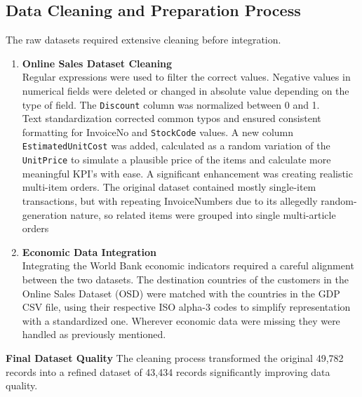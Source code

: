 \documentclass[a4paper,11pt]{article}
\begin{document}
\subsection{Data Cleaning and Preparation Process}

The raw datasets required extensive cleaning before integration.

\begin{enumerate}
    \item  \textbf{Online Sales Dataset Cleaning}\\
    Regular expressions were used to filter the correct values.
    Negative values in numerical fields were deleted or changed in absolute value depending on the type of field.
    The \texttt{Discount} column was normalized between 0 and 1.\\
    Text standardization corrected common typos and ensured consistent formatting for InvoiceNo and \texttt{StockCode} values.
    A new column \texttt{EstimatedUnitCost} was added, calculated as a random variation of the \texttt{UnitPrice} to simulate a plausible price of the items and calculate more meaningful KPI's with ease.
    A significant enhancement was creating realistic multi-item orders.
    The original dataset contained mostly single-item transactions, but with repeating InvoiceNumbers due to its allegedly random-generation nature, so related items were grouped into single multi-article orders

    \item \textbf{Economic Data Integration}\\
    Integrating the World Bank economic indicators required a careful alignment between the two datasets. 
    The destination countries of the customers in the Online Sales Dataset (OSD) were matched with the countries in the GDP CSV file, using their respective ISO alpha-3 codes to simplify representation with a standardized one.
    Wherever economic data were missing they were handled as previously mentioned.
\end{enumerate}
\textbf{Final Dataset Quality}
The cleaning process transformed the original 49,782 records into a refined dataset of 43,434 records significantly improving data quality.
\end{document}
